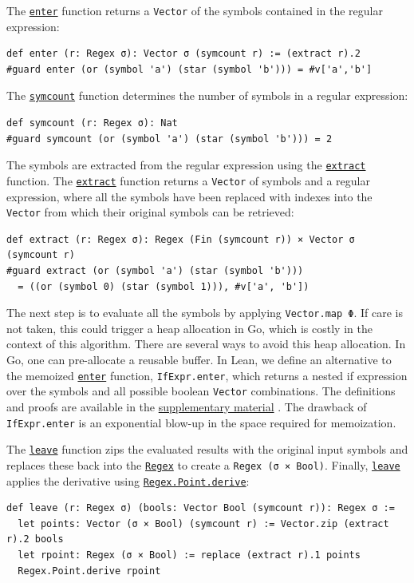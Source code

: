 \documentclass[acmsmall,%
  screen,%
  authorversion, %
  nonacm%
]{acmart}
\newcommand{\link}[2]{\mbox{\hyperref[#2]{\lstinline{#1}}}\xspace}
\newcommand{\Regex}{\link{Regex}{Regex}}
\newcommand{\symcount}{\link{symcount}{def symcount}}
\newcommand{\enter}{\link{enter}{def enter}}
\newcommand{\leave}{\link{leave}{def leave}}
\newcommand{\extract}{\link{extract}{def extract}}
\newcommand{\RegexPointDerive}{\link{Regex.Point.derive}{def Regex.Point.derive}}
\newcommand{\supplementarymaterial}{%
  \hyperref[supplementary_material]{supplementary material}\xspace%
}
\begin{document}
The \enter function returns a \lstinline{Vector} of the symbols contained in the regular expression:
\begin{lstlisting}[label=def enter]
def enter (r: Regex σ): Vector σ (symcount r) := (extract r).2
#guard enter (or (symbol 'a') (star (symbol 'b'))) = #v['a','b']
\end{lstlisting}

The \symcount function determines the number of symbols in a regular expression:
\begin{lstlisting}[label=def symcount]
def symcount (r: Regex σ): Nat
#guard symcount (or (symbol 'a') (star (symbol 'b'))) = 2
\end{lstlisting}

The symbols are extracted from the regular expression using the \extract function.
The \extract function returns a \lstinline{Vector} of symbols and a regular expression, where all the symbols have been replaced with indexes into the \lstinline{Vector} from which their original symbols can be retrieved:
\begin{lstlisting}[label=def extract]
def extract (r: Regex σ): Regex (Fin (symcount r)) × Vector σ (symcount r)
#guard extract (or (symbol 'a') (star (symbol 'b')))
  = ((or (symbol 0) (star (symbol 1))), #v['a', 'b'])
\end{lstlisting}

The next step is to evaluate all the symbols by applying \lstinline{Vector.map Φ}.
If care is not taken, this could trigger a heap allocation in Go, which is costly in the context of this algorithm.
There are several ways to avoid this heap allocation.
In Go, one can pre-allocate a reusable buffer.
In Lean, we define an alternative to the memoized \enter function, \lstinline{IfExpr.enter}, which returns a nested if expression over the symbols and all possible boolean \lstinline{Vector} combinations.
The definitions and proofs are available in the \supplementarymaterial.
The drawback of \lstinline{IfExpr.enter} is an exponential blow-up in the space required for memoization.

The \leave function zips the evaluated results with the original input symbols and replaces these back into the \Regex to create a \lstinline{Regex (σ × Bool)}.
Finally, \leave applies the derivative using \RegexPointDerive:
\begin{lstlisting}[label=def leave]
def leave (r: Regex σ) (bools: Vector Bool (symcount r)): Regex σ :=
  let points: Vector (σ × Bool) (symcount r) := Vector.zip (extract r).2 bools
  let rpoint: Regex (σ × Bool) := replace (extract r).1 points
  Regex.Point.derive rpoint
\end{lstlisting}
\end{document}
